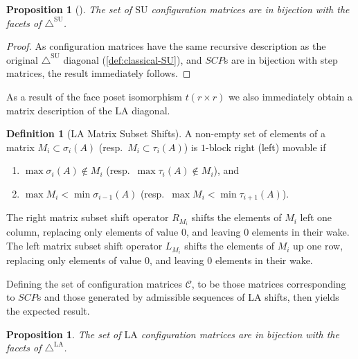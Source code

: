 \documentclass{amsart}
\newtheorem{proposition}[theorem]{Proposition}
\theoremstyle{definition}
\newtheorem{definition}[theorem]{Definition}
\newcommand{\resp}{resp.~} %
\newcommand{\SU}{\mathrm{SU}}
\newcommand{\LA}{\mathrm{LA}}
\newcommand{\SUD}{\triangle^{\mathrm{SU}}}
\newcommand{\LAD}{\triangle^{\mathrm{LA}}}
\begin{document}
\begin{proposition}[\cite{SaneblidzeUmble}]
The set of $\SU$ configuration matrices are in bijection with the facets of $\SUD$.
\end{proposition}
\begin{proof}
As configuration matrices have the same recursive description as the original $\SUD$ diagonal (\cref{def:classical-SU}), and $SCP$s are in bijection with step matrices, the result immediately follows.
\end{proof}

As a result of the face poset isomorphism $t(r\times r)$ we also immediately obtain a matrix description of the $\LA$ diagonal.
\begin{definition}[LA Matrix Subset Shifts]
A non-empty set of elements of a matrix $M_i \subset \sigma_i(A)$ (\resp $M_{i}\subset \tau_{i}(A)$) is $1$-block right (left) movable if
\begin{enumerate}
	\item $\max \sigma_i(A) \notin M_i$ (\resp $\max \tau_{i}(A) \notin M_i$), and
	\item $\max M_i < \min \sigma_{i-1}(A)$ (\resp $\max M_{i} < \min \tau_{i+1}(A)$).
\end{enumerate}
The right matrix subset shift operator $R_{M_i}$ shifts the elements of $M_i$ left one column, replacing only elements of value $0$, and leaving $0$ elements in their wake.
The left matrix subset shift operator $L_{M_i}$ shifts the elements of $M_i$ up one row, replacing only elements of value $0$, and leaving $0$ elements in their wake.
\end{definition}
Defining the set of configuration matrices $\mathcal{C}$, to be those matrices  corresponding to $SCP$s and those generated by admissible sequences of $\LA$ shifts, then yields the expected result.
\begin{proposition}
The set of $\LA$ configuration matrices are in bijection with the facets of $\LAD$.
\end{proposition}
\end{document}
